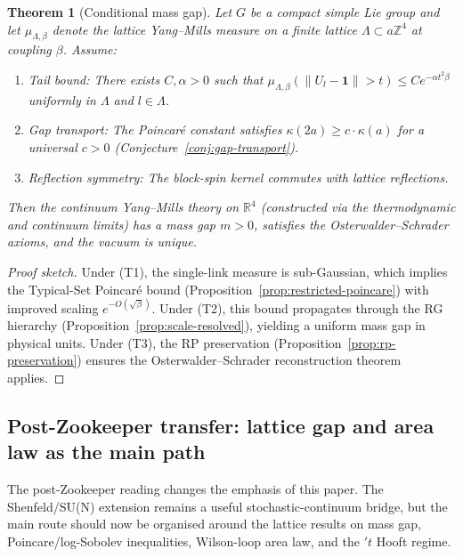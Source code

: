 \documentclass[12pt,a4paper]{article}
\theoremstyle{definition}
\theoremstyle{plain}
\newtheorem{theorem}[definition]{Theorem}
\theoremstyle{remark}
\begin{document}
\begin{theorem}[Conditional mass gap]
\label{thm:conditional-gap}
Let $G$ be a compact simple Lie group and let $\mu_{\Lambda,\beta}$ denote the lattice Yang--Mills measure on a finite lattice $\Lambda \subset a\mathbb{Z}^4$ at coupling $\beta$. Assume:
\begin{enumerate}
\item[\textup{(T1)}] \emph{Tail bound:} There exists $C, \alpha > 0$ such that $\mu_{\Lambda,\beta}(\|U_l - \mathbf{1}\| > t) \leq C e^{-\alpha t^2 \beta}$ uniformly in $\Lambda$ and $l \in \Lambda$.
\item[\textup{(T2)}] \emph{Gap transport:} The Poincar\'e constant satisfies $\kappa(2a) \geq c \cdot \kappa(a)$ for a universal $c > 0$ (Conjecture~\ref{conj:gap-transport}).
\item[\textup{(T3)}] \emph{Reflection symmetry:} The block-spin kernel commutes with lattice reflections.
\end{enumerate}
Then the continuum Yang--Mills theory on $\mathbb{R}^4$ (constructed via the thermodynamic and continuum limits) has a mass gap $m > 0$, satisfies the Osterwalder--Schrader axioms, and the vacuum is unique.
\end{theorem}

\begin{proof}[Proof sketch]
Under (T1), the single-link measure is sub-Gaussian, which implies the Typical-Set Poincar\'e bound (Proposition~\ref{prop:restricted-poincare}) with improved scaling $e^{-O(\sqrt{\beta})}$. Under (T2), this bound propagates through the RG hierarchy (Proposition~\ref{prop:scale-resolved}), yielding a uniform mass gap in physical units. Under (T3), the RP preservation (Proposition~\ref{prop:rp-preservation}) ensures the Osterwalder--Schrader reconstruction theorem applies.
\end{proof}

\subsection{Post-Zookeeper transfer: lattice gap and area law as the main path}
\label{subsec:zookeeper-ym-transfer}

The post-Zookeeper reading changes the emphasis of this paper.  The
Shenfeld/SU(N) extension remains a useful stochastic-continuum bridge, but
the main route should now be organised around the lattice results on
mass gap, Poincare/log-Sobolev inequalities, Wilson-loop area law, and the
$'t$ Hooft regime.
\end{document}
